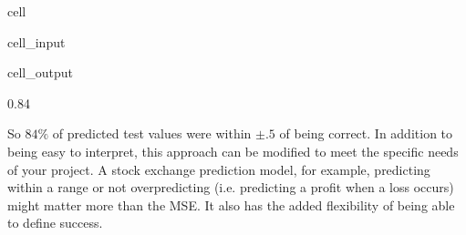 \documentclass[letterpaper,10pt,english]{jupyterBook}
\begin{document}
\begin{sphinxuseclass}{cell}\begin{sphinxVerbatimInput}

\begin{sphinxuseclass}{cell_input}
\begin{sphinxVerbatim}[commandchars=\\\{\}]
   
      
       
      \PYG{p}{[}\PYG{p}{]}
        
             
              
      
     

  
\end{sphinxVerbatim}

\end{sphinxuseclass}\end{sphinxVerbatimInput}
\begin{sphinxVerbatimOutput}

\begin{sphinxuseclass}{cell_output}
\begin{sphinxVerbatim}[commandchars=\\\{\}]
0.84
\end{sphinxVerbatim}

\end{sphinxuseclass}\end{sphinxVerbatimOutput}

\end{sphinxuseclass}
\sphinxAtStartPar
So \(84\%\) of predicted test values were within \(\pm .5\) of being correct. In addition to being easy to interpret, this approach can be modified to meet the specific needs of your project. A stock exchange prediction model, for example, predicting within a range or not overpredicting (i.e. predicting a profit when a loss occurs) might matter more than the MSE. It also has the added flexibility of being able to define success.
\end{document}
